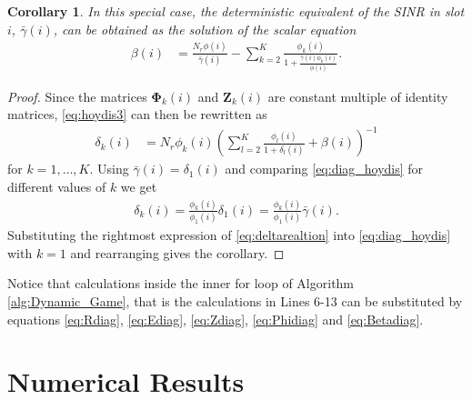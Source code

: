 \documentclass[conference, a4paper, 10pt]{IEEEtran}
\newtheorem{cor}{Corollary}
\newcommand{\mx}[1]{\mathbf{#1}}
\newcommand{\bs}[1]{\boldsymbol{#1}}
\begin{document}
\begin{cor}
\label{Cor:DetEq}
In this special case, the deterministic equivalent of the \textup{SINR} in slot $i$,
$\bar{\gamma}(i)$, can be obtained as the solution of the scalar equation
\begin{align}
\beta(i)  &=
\frac{N_r \phi(i)}{\bar{\gamma}(i)} - \sum_{k = 2}^K \frac{\phi_k(i)}{1 + \frac{\bar{\gamma}(i)\phi_k(i)}{\phi(i)}}.
\label{eq:diag_hoydis1}
\end{align}
\end{cor}

\begin{proof}
Since the matrices $\bs{\Phi}_k(i)$ and $\mx{Z}_k(i)$ are constant multiple of identity matrices, \eqref{eq:hoydis3} can then be rewritten as
\begin{align}
\delta_k(i) &= N_r \phi_k(i) \left( \sum_{l = 2}^{K} \frac{\phi_l(i)}{1 + \delta_l(i)} +
\beta(i) \right)^{-1}
\label{eq:diag_hoydis}
\end{align}
for $k = 1, \ldots, K$.
Using $\bar{\gamma}(i) = \delta_1(i)$ and comparing \eqref{eq:diag_hoydis} for different values of $k$ we get
\begin{align}
\delta_k(i) = \frac{ \phi_k(i)  }{  \phi_1(i)  } \delta_1(i) = \frac{ \phi_k(i)  }{  \phi_1(i) } \bar{\gamma}(i).
\label{eq:deltarealtion}
\end{align}
Substituting the rightmost expression of \eqref{eq:deltarealtion} into \eqref{eq:diag_hoydis} with $k = 1$ and rearranging gives the corollary.
\end{proof}

Notice that calculations inside the inner for loop of Algorithm \ref{alg:Dynamic_Game}, that is the
calculations in Lines 6-13 can be substituted by equations
\eqref{eq:Rdiag}, \eqref{eq:Ediag}, \eqref{eq:Zdiag}, \eqref{eq:Phidiag} and \eqref{eq:Betadiag}.

\section{Numerical Results}
\label{Sec:Num}
\end{document}
